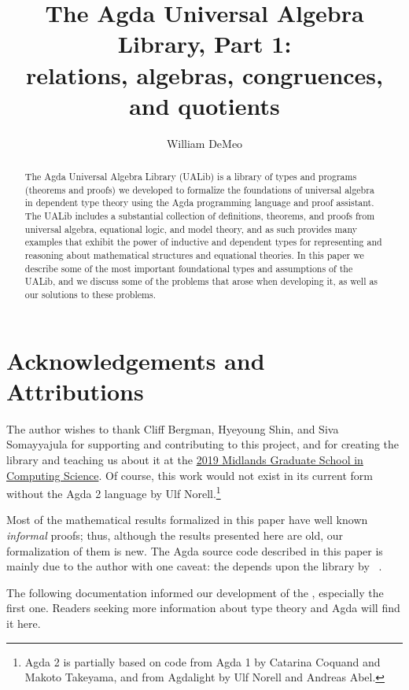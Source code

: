 \documentclass[a4paper,UKenglish,cleveref,autoref,thm-restate]{../lipics-v2021-wjd}
\title{The Agda Universal Algebra Library, Part 1:\\relations, algebras, congruences, and quotients}
\author{William DeMeo}
       {Department of Algebra, Charles University in Prague \and \url{https://williamdemeo.gitlab.io}}
       {williamdemeo@gmail.com}
       {https://orcid.org/0000-0003-1832-5690}
       {}
\begin{document}
\maketitle


\begin{abstract}
The Agda Universal Algebra Library (UALib) is a library of types and programs (theorems and proofs) we developed to formalize the foundations of universal algebra in dependent type theory using the Agda programming language and proof assistant. 
 The UALib includes a substantial collection of definitions, theorems, and proofs from universal algebra, equational logic, and model theory, and as such provides many examples that exhibit the power of inductive and dependent types for representing and reasoning about mathematical structures and equational theories. In this paper we describe some of the most important foundational types and assumptions of the UALib, and we discuss some of the problems that arose when developing it, as well as our solutions to these problems.
\end{abstract}

\section*{Acknowledgements and Attributions}

The author wishes to thank Cliff Bergman, Hyeyoung Shin, and Siva Somayyajula for supporting and contributing to this project, and \MartinEscardo for creating the \TypeTopology library and teaching us about it at the \href{http://events.cs.bham.ac.uk/mgs2019/}{2019 Midlands Graduate School in Computing Science}. Of course, this work would not exist in its current form without the Agda 2 language by Ulf Norell.\footnote{Agda 2 is partially based on code from Agda 1 by Catarina Coquand and Makoto Takeyama, and from Agdalight by Ulf Norell and Andreas Abel.}

Most of the mathematical results formalized in this paper have well known \emph{informal} proofs; thus, although the results presented here are old, our formalization of them is new.  The Agda source code described in this paper is mainly due to the author with one caveat: the \ualib depends upon the \typetopology library by \escardo~\cite{MHE}. 

The following \agda documentation informed our development of the \ualib, especially the first one. Readers seeking more information about type theory and Agda will find it here.
\end{document}
